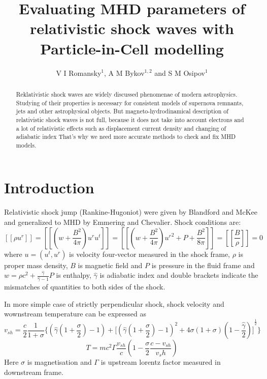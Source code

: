 \documentclass[a4paper]{jpconf}
\begin{document}
\title{Evaluating MHD parameters of relativistic shock waves with Particle-in-Cell modelling}

\author{V I Romansky$^{1}$, A M Bykov$^{1,2}$ and S M Osipov$^1$}

\address{$^1$ Ioffe Institute, 26 Politekhnicheskaya st., St. Petersburg 194021, Russia}
\address{$^2$ Peter the Great St. Petersburg Polytechnic University, 29 Politekhnicheskaya st., St. Petersburg 195251, Russia}


\begin{abstract}
Reklativistic shock waves are widely discussed phenomenae of modern astrophysics. Studying of their properties is necessary for consistent models of supernova remnants, jets and other astrophysical objects. But magneto-hydrodinamical description of relativistic shock waves is not full, because it does not take into account electrons and a lot of relativistic effects such as displacement current density and changing of adiabatic index That's why we need more accurate methods to check and fix MHD models.
\end{abstract}
\section{Introduction}
Relativistic shock jump (Rankine-Hugoniot) were given by Blandford and McKee \cite{Blandford76} and generalized to MHD by Emmering and Chevalier\cite{Emmering87}. Shock conditions are:
\begin{equation}\label{hugoniot}
[\![\rho u^r]\!] = [\![ (w + \frac{B^2}{4 \pi})u^r u^t]\!] = [\![(w + \frac{B^2}{4 \pi}){u^r}^2 + P + \frac{B^2}{8 \pi}]\!] = [\![\frac{B}{\rho}]\!] = 0
\end{equation}
where $u = (u^t,u^r)$ is velocity four-vector measured in the shock frame, $\rho$ is proper mass density, $B$ is magnetic field and $P$ is pressure in the fluid frame and $w = \rho c^2 + \frac{\hat{\gamma}}{\hat{\gamma} - 1} P$ is enthalpy, $\hat{\gamma}$ is adiabatic index and double brackets indicate the mismatches of quantities to both sides of the shock.

In more simple case of strictly perpendicular shock, shock velocity and wownstream temperature can be expressed\cite{Amato2006} as
\begin{equation}\label{vshock}
v_{sh} = \frac{c}{2}\frac{1}{1 + \sigma}\lbrace (\hat{\gamma}(1 + \frac{\sigma}{2})-1) + {\lbrack (\hat{\gamma}(1 + \frac{\sigma}{2})-1)^2 + 4\sigma(1+\sigma)(1 - \frac{\hat{\gamma}}{2})\rbrack}^{\frac{1}{2}} \rbrace
\end{equation}
\begin{equation}\label{temperature}
T = m c^2 \Gamma \frac{v_{sh}}{c}(1 - \frac{\sigma}{2}\frac{c - v_{sh}}{v_sh})
\end{equation}
Here $\sigma$ is magnetisation and $\Gamma$ is upstream lorentz factor measured in downstream frame.
\end{document}
